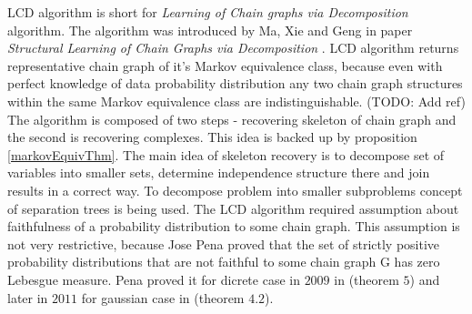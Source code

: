 %
%

LCD algorithm is short for \textit{Learning of Chain graphs via Decomposition} algorithm. The algorithm was introduced by Ma, Xie and Geng in paper 
\textit{Structural Learning of Chain Graphs via Decomposition} \cite{CG}. LCD algorithm returns 
representative chain graph of it's Markov equivalence class, because even with perfect knowledge of data probability
distribution any two chain graph structures within the same Markov equivalence class are indistinguishable. (TODO: Add ref)
The algorithm is composed of two steps - recovering skeleton of chain graph and the second is recovering complexes. This
idea is backed up by proposition \ref{markovEquivThm}. 
The main idea of skeleton recovery is to decompose set of variables into smaller sets, determine independence structure there and join results in a correct way. 
To decompose problem into smaller subproblems concept of separation trees is being used.
The LCD algorithm required assumption about faithfulness of a probability distribution to some chain graph. This assumption is not very restrictive, because Jose Pena proved that the
set of strictly positive probability distributions that are not faithful to some chain graph G has zero Lebesgue measure. Pena proved it for dicrete case in $2009$ in \cite{FaithDicr}
(theorem $5$) and later in $2011$ for gaussian case in \cite{FaithGauss} (theorem $4.2$).


